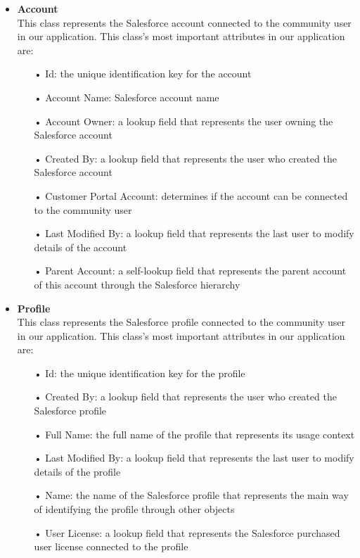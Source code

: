 \begin{itemize}
\begin{itemize}
\end{itemize}
\item \textbf{Account}\\
This class represents the Salesforce account connected to the community user in our application. This class's most important attributes in our application are:
\begin{itemize}
\item[•] Id: the unique identification key for the account 
\item[•] Account Name: Salesforce account name
\item[•] Account Owner: a lookup field that represents the user owning the Salesforce account 
\item[•] Created By: a lookup field that represents the user who created the Salesforce account 
\item[•] Customer Portal Account: determines if the account can be connected to the community user
\item[•] Last Modified By: a lookup field that represents the last user to modify details of the account
\item[•] Parent Account: a self-lookup field that represents the parent account of this account through the Salesforce hierarchy
\end{itemize}
\item \textbf{Profile}\\
This class represents the Salesforce profile connected to the community user in our application. This class's most important attributes in our application are:
\begin{itemize}
\item[•] Id: the unique identification key for the profile 
\item[•] Created By: a lookup field that represents the user who created the Salesforce profile 
\item[•] Full Name: the full name of the profile that represents its usage context 
\item[•] Last Modified By: a lookup field that represents the last user to modify details of the profile
\item[•] Name: the name of the Salesforce profile that represents the main way of identifying the profile through other objects
\item[•] User License: a lookup field that represents the Salesforce purchased user license connected to the profile 


\end{itemize}
\end{itemize}
